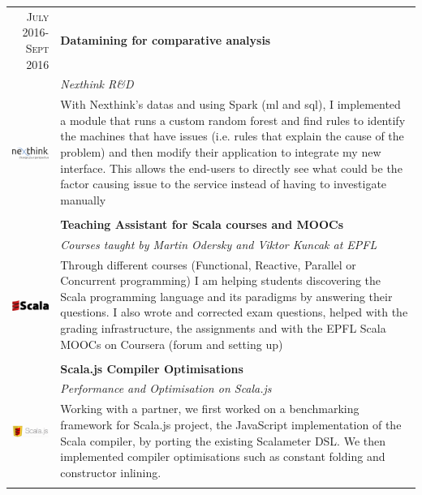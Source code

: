 \documentclass[a4paper,11pt]{article} %
\begin{document}
\begin{tabularx}{\textwidth}{r|X}

\textsc{July 2016-Sept 2016} & \textbf{Datamining for comparative analysis}\\
\multirow{4}{*}{ \includegraphics[width=50pt]{img/nexthinkLogo.png}}
& \emph{Nexthink R\&D}\\
& \footnotesize{With Nexthink's datas and using Spark (ml and sql), I implemented a module that runs a custom random forest and find rules to identify the machines that have issues (i.e. rules that explain the cause of the problem) and then modify their application to integrate my new interface. This allows the end-users to directly see what could be the factor causing issue to the service instead of having to investigate manually}\\
\multicolumn{2}{c}{} \\


\textsc{Feb 2015-Current} & \textbf{Teaching Assistant for Scala courses and MOOCs} \\
\multirow{4}{*}{ \includegraphics[width=50pt]{img/Scala.eps}}
& \emph{Courses taught by Martin Odersky and Viktor Kuncak at EPFL}\\ 
& \footnotesize{Through different courses (Functional, Reactive, Parallel or Concurrent programming) I am helping students discovering the Scala programming language and its paradigms by answering their questions. I also wrote and corrected exam questions, helped with the grading infrastructure, the assignments and with the EPFL Scala MOOCs on Coursera (forum and setting up) }\\
\multicolumn{2}{c}{} \\


\textsc{Sept 2015-Jan 2016} & \textbf{Scala.js Compiler Optimisations} \\
\multirow{4}{*}{ \includegraphics[width=50pt]{img/scalajs.png}}
& \emph{Performance and Optimisation on Scala.js}\\ 
& \footnotesize{Working with a partner, we first worked on a
benchmarking framework for Scala.js project, the JavaScript implementation of
the Scala compiler, by porting the existing Scalameter DSL.
We then implemented compiler optimisations such as constant folding and
constructor inlining.}\\
\multicolumn{2}{c}{} \\


\end{tabularx}
\end{document}
